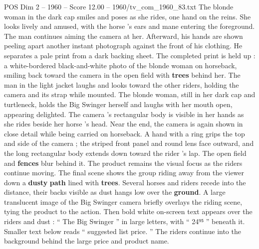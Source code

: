 \begin{textsample}{POS Dim 2 – 1960 – Score 12.00 – 1960/tv\_com\_1960\_83.txt}
The blonde woman in the dark cap smiles and poses as she rides, one hand on the reins.
She looks lively and amused, with the horse ’s ears and mane entering the foreground.
The man continues aiming the camera at her.
Afterward, his hands are shown peeling apart another instant photograph against the front of his clothing.
He separates a pale print from a dark backing sheet.
The completed print is held up : a white-bordered black-and-white photo of the blonde woman on horseback, smiling back toward the camera in the open field with \textbf{trees} behind her.
The man in the light jacket laughs and looks toward the other riders, holding the camera and its strap while mounted.
The blonde woman, still in her dark cap and turtleneck, holds the Big Swinger herself and laughs with her mouth open, appearing delighted.
The camera ’s rectangular body is visible in her hands as she rides beside her horse ’s head.
Near the end, the camera is again shown in close detail while being carried on horseback.
A hand with a ring grips the top and side of the camera ; the striped front panel and round lens face outward, and the long rectangular body extends down toward the rider ’s lap.
The open field and \textbf{fences} blur behind it.
The product remains the visual focus as the riders continue moving.
The final scene shows the group riding away from the viewer down a \textbf{dusty} \textbf{path} lined with \textbf{trees}.
Several horses and riders recede into the distance, their backs visible as dust hangs low over the \textbf{ground}.
A large translucent image of the Big Swinger camera briefly overlays the riding scene, tying the product to the action.
Then bold white on-screen text appears over the riders and dust : “ The Big Swinger ” in large letters, with “ 24⁹⁵ ” beneath it.
Smaller text below reads “ suggested list price. ” The riders continue into the background behind the large price and product name.

\end{textsample}
